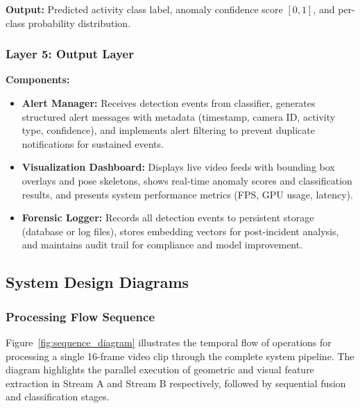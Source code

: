 \documentclass[12pt]{article}
\begin{document}
\textbf{Output:} Predicted activity class label, anomaly confidence score $[0,1]$, and per-class probability distribution.

\subsubsection{Layer 5: Output Layer}

\textbf{Components:}
\begin{itemize}
    \item \textbf{Alert Manager:} Receives detection events from classifier, generates structured alert messages with metadata (timestamp, camera ID, activity type, confidence), and implements alert filtering to prevent duplicate notifications for sustained events.
    
    \item \textbf{Visualization Dashboard:} Displays live video feeds with bounding box overlays and pose skeletons, shows real-time anomaly scores and classification results, and presents system performance metrics (FPS, GPU usage, latency).
    
    \item \textbf{Forensic Logger:} Records all detection events to persistent storage (database or log files), stores embedding vectors for post-incident analysis, and maintains audit trail for compliance and model improvement.
\end{itemize}

\clearpage
\subsection{System Design Diagrams}

\subsubsection{Processing Flow Sequence}

Figure~\ref{fig:sequence_diagram} illustrates the temporal flow of operations for processing a single 16-frame video clip through the complete system pipeline. The diagram highlights the parallel execution of geometric and visual feature extraction in Stream A and Stream B respectively, followed by sequential fusion and classification stages.
\end{document}
